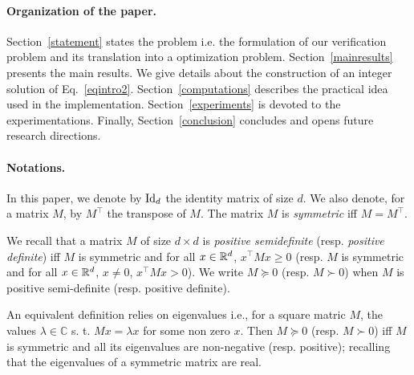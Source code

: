 \documentclass[10pt]{llncs}
\begin{document}

\paragraph{Organization of the paper.}
Section~\ref{statement} states the problem i.e. the formulation of our verification problem and its translation into a optimization problem. Section~\ref{mainresults} presents the main results. We give details about the construction of an integer solution of Eq.~\eqref{eqintro2}. Section~\ref{computations} describes the practical idea used in the implementation.  Section~\ref{experiments} is devoted to the experimentations. Finally, Section~\ref{conclusion} concludes and opens future research directions.


\paragraph{Notations.}
In this paper, we denote by $\operatorname{Id}_d$ the identity matrix of size $d$.
We also denote, for a matrix $M$, by $M^\intercal$ the transpose of $M$. The matrix $M$ is {\it symmetric} iff $M=M^\intercal$.

We recall that a matrix $M$ of size $d\times d$ is {\it positive semidefinite} (resp. {\it positive definite}) iff $M$ is symmetric and for all $x\in\mathbb R^d$, $x^\intercal M x\geq 0$ (resp. $M$ is symmetric and for all $x\in\mathbb R^d$, $x\neq 0$, $x^\intercal M x> 0$). We write $M\succeq 0$ (resp. $M\succ 0$)  when $M$ is positive semi-definite (resp. positive definite).

An equivalent definition relies on eigenvalues i.e., for a square matric $M$, the values $\lambda\in\mathbb C$ s. t. $Mx=\lambda x$ for some non zero $x$. Then $M\succeq 0$ (resp. $M\succ 0$) iff $M$ is symmetric and all its eigenvalues are non-negative (resp. positive); recalling that the eigenvalues of a symmetric matrix are real.
\end{document}
